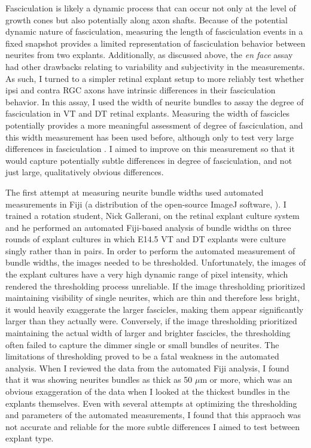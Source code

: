\label{sec:BundleWidth}
Fasciculation is likely a dynamic process that can occur not only at the level of growth cones but also potentially along axon shafts.
Because of the potential dynamic nature of fasciculation, measuring the length of fasciculation events in a fixed snapshot provides a limited representation of fasciculation behavior between neurites from two explants.
Additionally, as discussed above, the \emph{en face} assay had other drawbacks relating to variability and subjectivity in the measurements.
As such, I turned to a simpler \invitro{} retinal explant setup to more reliably test whether ipsi and contra RGC axons have intrinsic differences in their fasciculation behavior.
In this assay, I used the width of neurite bundles to assay the degree of fasciculation in VT and DT retinal explants.
Measuring the width of fascicles potentially provides a more meaningful assessment of degree of fasciculation, and this width measurement has been used before, although only to test very large differences in fasciculation \cite{jaworski2012autocrine}.
I aimed to improve on this measurement so that it would capture potentially subtle differences in degree of fasciculation, and not just large, qualitatively obvious differences.

The first attempt at measuring neurite bundle widths used automated measurements in Fiji (a distribution of the open-source ImageJ software, ).
I trained a rotation student, Nick Gallerani, on the retinal explant culture system and he performed an automated Fiji-based analysis of bundle widths on three rounds of explant cultures in which E14.5 VT and DT explants were culture singly rather than in pairs.
In order to perform the automated measurement of bundle widths, the images needed to be thresholded.
Unfortunately, the images of the explant cultures have a very high dynamic range of pixel intensity, which rendered the thresholding process unreliable.
If the image thresholding prioritized maintaining visibility of single neurites, which are thin and therefore less bright, it would heavily exaggerate the larger fascicles, making them appear significantly larger than they actually were.
Conversely, if the image thresholding prioritized maintaining the actual width of larger and brighter fascicles, the thresholding often failed to capture the dimmer single or small bundles of neurites.
The limitations of thresholding proved to be a fatal weakness in the automated analysis.
When I reviewed the data from the automated Fiji analysis, I found that it was showing neurites bundles as thick as 50 $\mu$m or more, which was an obvious exaggeration of the data when I looked at the thickest bundles in the explants themselves.
Even with several attempts at optimizing the thresholding and parameters of the automated measurements, I found that this appraoch was not accurate and reliable for the more subtle differences I aimed to test between explant type.

